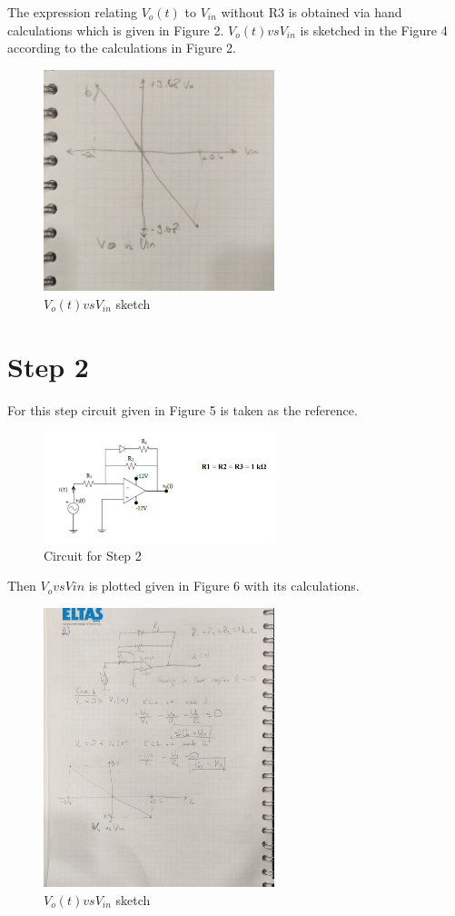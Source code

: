 \documentclass[letterpaper,12pt]{article}
\begin{document}
The expression relating \(V_o(t)\) to \(V_{in}\) without R3 is obtained via hand calculations which is given in Figure 2.
\(V_o(t) vs V_{in}\) is sketched in the Figure 4 according to the calculations in Figure 2.
\begin{figure}[H]
	\centering
   \includegraphics[width=0.6\textwidth]{2_b_sketch.jpeg}
   \caption{\(V_o(t) vs V_{in}\) sketch}
\end{figure} 

\section{Step 2}

For this step circuit given in Figure 5 is taken as the reference.
\begin{figure}[H]
	\centering
   \includegraphics[width=0.6\textwidth]{circuit_2.png}
   \caption{Circuit for Step 2}
\end{figure} 

Then \(V_o vs V{in}\) is plotted given in Figure 6 with its calculations.
\begin{figure}[H]
	\centering
   \includegraphics[width=0.6\textwidth]{2_hand.jpeg}
   \caption{\(V_o(t) vs V_{in}\) sketch}
\end{figure} 
\end{document}
